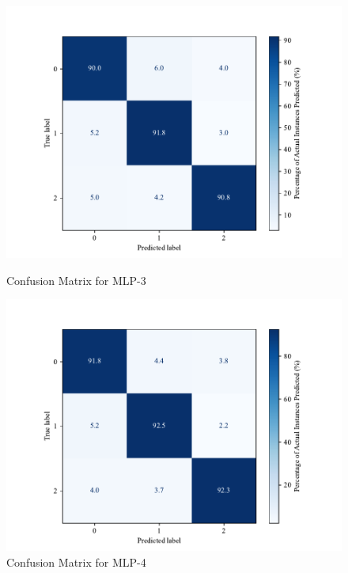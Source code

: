    \begin{figure}[htbp]
        \centering
        \begin{minipage}[b]{0.45\textwidth}
            \centering
            \includegraphics[width=\textwidth]{images/confusion_matrix_mlp100log.pdf}
            \caption{Confusion Matrix for MLP-3}
            \label{fig:confusion_mlp_3}
        \end{minipage}
        \hfill
        \begin{minipage}[b]{0.45\textwidth}
            \centering
            \includegraphics[width=\textwidth]{images/confusion_matrix_mlp200log.pdf}
            \caption{Confusion Matrix for MLP-4}
            \label{fig:confusion_mlp_4}
        \end{minipage}
    \end{figure}
